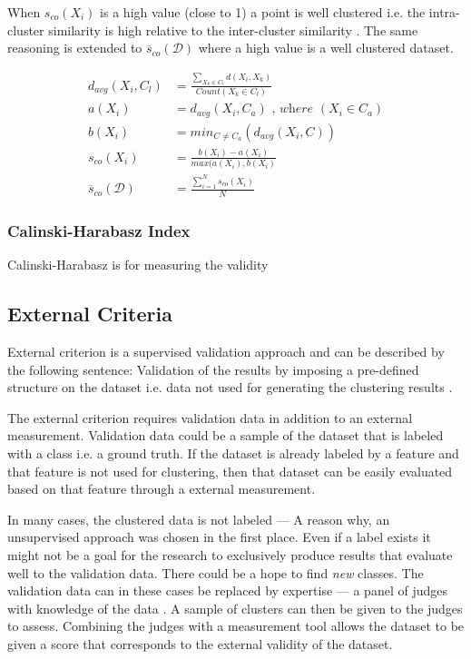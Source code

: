 \documentclass[../report.tex]{subfiles}
\begin{document}
When $s_{co}(X_i)$ is a high value (close to 1) a point is well clustered i.e. the intra-cluster similarity is high relative to the inter-cluster similarity \cite{ROUSSEEUW198753}
. The same reasoning is extended to $\overline{s}_{co}(\mathcal{D})$ where a high value is a well clustered dataset.

\begin{align}
  d_{avg}(X_i,C_l) &= \frac{\sum_{X_k \in C_l}d(X_i,X_k)}{Count(X_k \in C_l)} \\
  a(X_i) &= d_{avg}(X_i,C_a) \textit{ , where } (X_i \in C_a) \\
  b(X_i) &= min_{C \neq C_a}(d_{avg}(X_i,C)) \\
 \label{eq:sil}
  s_{co}(X_i) &= \frac{b(X_i) - a(X_i)}{max(a(X_i), b(X_i)} \\
\label{eq:avg_s}
  \overline{s}_{co}(\mathcal{D}) &= \frac{\sum^{N}_{i=1} s_{co}(X_i)}{N}
\end{align}

\subsubsection{Calinski-Harabasz Index}
Calinski-Harabasz is for measuring the validity


\subsection{External Criteria}
External criterion is a supervised validation approach and can be described by the following sentence: Validation of the results by imposing a pre-defined structure on the dataset i.e. data not used for generating the clustering results \cite{Halkidi2002}.

The external criterion requires validation data in addition to an external measurement. Validation data could be a sample of the dataset that is labeled with a class i.e. a ground truth. If the dataset is already labeled by a feature and that feature is not used for clustering, then that dataset can be easily evaluated based on that feature through a external measurement.

In many cases, the clustered data is not labeled --- A reason why, an unsupervised approach was chosen in the first place. Even if a label exists it might not be a goal for the research to exclusively produce results that evaluate well to the validation data. There could be a hope to find \textit{new} classes. The validation data can in these cases be replaced by expertise --- a panel of judges with knowledge of the data \cite{manning2010introduction}. A sample of clusters can then be given to the judges to assess. Combining the judges with a measurement tool allows the dataset to be given a score that corresponds to the external validity of the dataset.
\end{document}
